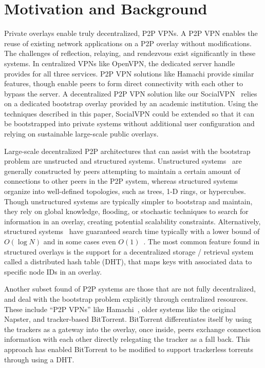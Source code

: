 \documentclass[conference]{IEEEtran}
\begin{document}
\section{Motivation and Background}
\label{background}

Private overlays enable truly decentralized, P2P VPNs.  A P2P VPN enables the
reuse of existing network applications on a P2P overlay without modifications.
The challenges of reflection, relaying, and rendezvous exist significantly in
these systems.  In centralized VPNs like OpenVPN, the dedicated server handle
provides for all three services.  P2P VPN solutions like Hamachi provide
similar features, though enable peers to form direct connectivity with each
other to bypass the server.  A decentralized P2P VPN solution like our
SocialVPN~\cite{socialvpn} relies on a dedicated bootstrap overlay provided by
an academic institution.  Using the techniques described in this paper,
SocialVPN could be extended so that it can be bootstrapped into private systems
without additional user configuration and relying on sustainable large-scale
public overlays.

Large-scale decentralized P2P architectures that can assist with the bootstrap
problem are unstructed and structured systems.  Unstructured
systems~\cite{gnutella, fasttrack} are generally constructed by peers
attempting to maintain a certain amount of connections to other peers in the
P2P system, whereas structured systems organize into well-defined topologies,
such as trees, 1-D rings, or hypercubes.  Though unstructured systems are
typically simpler to bootstrap and maintain, they rely on global knowledge,
flooding, or stochastic techniques to search for information in an overlay,
creating potential scalability constraints.  Alternatively, structured
systems~\cite{pastry, chord, symphony, kademlia, can} have guaranteed search
time typically with a lower bound of $O(\log N)$ and in some cases even
$O(1)$~\cite{beehive}.  The most common feature found in structured overlays is
the support for a decentralized storage / retrieval system called a distributed
hash table (DHT), that maps keys with associated data to specific node IDs in
an overlay.  

Another subset found of P2P systems are those that are not fully decentralized,
and deal with the bootstrap problem explicitly through centralized resources.
These include ``P2P VPNs'' like Hamachi~\cite{hamachi}, older systems like the
original Napster, and tracker-based BitTorrent.  BitTorrent differentiates
itself by using the trackers as a gateway into the overlay, once inside, peers
exchange connection information with each other directly relegating the tracker
as a fall back.  This approach has enabled BitTorrent to be modified to support
trackerless torrents through using a DHT.
\end{document}
